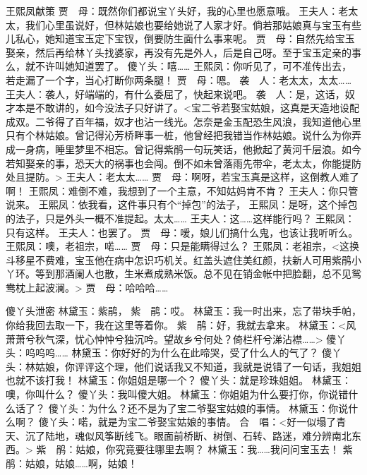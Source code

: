 \documentclass{article}
\begin{document}
王熙凤献策
贾　母：既然你们都说宝丫头好，我的心里也愿意哦。
王夫人：老太太，我们心里虽说好，但林姑娘也要给她说了人家才好。倘若那姑娘真与宝玉有些儿私心，她知道宝玉定下宝钗，倒要防生面什么事来呢。
贾　母：自然先给宝玉娶亲，然后再给林丫头找婆家，再没有先是外人，后是自己呀。至于宝玉定亲的事么，就不许叫她知道罢了。
傻丫头：嘻……
王熙凤：你听见了，可不准传出去，若走漏了一个字，当心打断你两条腿！
贾　母：嗯。
袭　人：老太太，太太……
王夫人：袭人，好端端的，有什么委屈了，快起来说吧。
袭　人：是，这话，奴才本是不敢讲的，如今没法子只好讲了。<宝二爷若娶宝姑娘，这真是天造地设配成双。二爷得了百年福，奴才也沾一线光。怎奈是金玉配恐生风浪，我知道他心里只有个林姑娘。曾记得沁芳桥畔事一桩，他曾经把我错当作林姑娘。说什么为你弄成一身病，睡里梦里不相忘。曾记得紫鹃一句玩笑话，他掀起了黄河千层浪。如今若知娶亲的事，恐天大的祸事也会闯。倒不如未曾落雨先带伞，老太太，你能提防处且提防。>
王夫人：老太太……
贾　母：啊呀，若宝玉真是这样，这倒教人难了啊！
王熙凤：难倒不难，我想到了一个主意，不知姑妈肯不肯？
王夫人：你只管说来。
王熙凤：依我看，这件事只有个“掉包”的法子，
王熙凤：是呀，这个掉包的法子，只是外头一概不准提起。太太……
王夫人：这……这样能行吗？
王熙凤：只有这样。
王夫人：也罢了。
贾　母：嗳，娘儿们搞什么鬼，也该让我听听么。
王熙凤：噢，老祖宗，喏……
贾　母：只是能瞒得过么？
王熙凤：老祖宗，<这换斗移星不费难，宝玉他在病中怎识巧机关。红盖头遮住美红颜，扶新人可用紫鹃小丫环。等到那酒阑人也散，生米煮成熟米饭。总不见在销金帐中把脸翻，总不见鸳鸯枕上起波澜。>
贾　母：哈哈哈……

傻丫头泄密
林黛玉：紫鹃，
紫　鹃：哎。
林黛玉：我一时出来，忘了带块手帕，你给我回去取一下，我在这里等着你。
紫　鹃：好，我就去拿来。
林黛玉：<风萧萧兮秋气深，忧心忡忡兮独沉吟。望故乡兮何处？倚栏杆兮涕沾襟……>
傻丫头：呜呜呜……
林黛玉：你好好的为什么在此啼哭，受了什么人的气了？
傻丫头：林姑娘，你评评这个理，他们说话我又不知道，我就是说错了一句话，我姐姐也就不该打我！
林黛玉：你姐姐是哪一个？
傻丫头：就是珍珠姐姐。
林黛玉：噢，你叫什么？
傻丫头：我叫傻大姐。
林黛玉：你姐姐为什么要打你，你说错什么话了？
傻丫头：为什么？还不是为了宝二爷娶宝姑娘的事情。
林黛玉：你说什么啊？
傻丫头：喏，就是为宝二爷娶宝姑娘的事情。
合　唱：<好一似塌了青天、沉了陆地，魂似风筝断线飞。眼面前桥断、树倒、石转、路迷，难分辨南北东西。>
紫　鹃：姑娘，你究竟要往哪里去啊？
林黛玉：我……我问问宝玉去！
紫　鹃：姑娘，姑娘……啊，姑娘！
\end{document}
